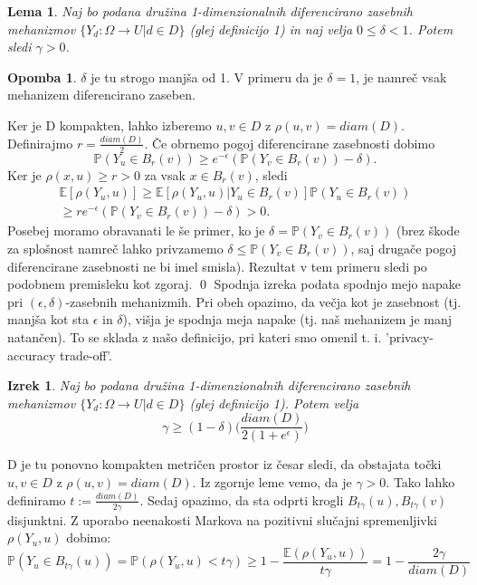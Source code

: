 \documentclass[12pt,a4paper]{amsart}
\theoremstyle{definition} %
\newtheorem{opomba}[definicija]{Opomba}
\theoremstyle{plain} %
\newtheorem{lema}[definicija]{Lema}
\newtheorem{izrek}[definicija]{Izrek}
\begin{document}
\begin{lema}
 Naj bo podana družina 1-dimenzionalnih diferencirano zasebnih mehanizmov $\{ Y_d: \Omega \rightarrow U | d \in D\}$ (glej definicijo 1) in naj velja $0 \leq \delta < 1$. Potem sledi $\gamma > 0$.
\end{lema}
\begin{opomba}
 $\delta$ je tu strogo manjša od 1. V primeru da je $\delta = 1$, je namreč vsak mehanizem diferencirano zaseben.
 \end{opomba}
\proof
 Ker je D kompakten, lahko izberemo $u,v \in D$ z $\rho(u,v)=diam(D)$. Definirajmo $r=\frac{diam(D)}{2}$. Če obrnemo pogoj diferencirane zasebnosti dobimo $$\mathbb{P}(Y_u \in B_r(v)) \geq e^{-\epsilon}(\mathbb{P}(Y_v \in B_r(v)) -\delta).$$ Ker je $\rho(x,u) \geq r > 0$ za vsak $x \in B_r(v)$, sledi 
\begin{gather*}
\mathbb{E}[\rho(Y_u,u)] \geq \mathbb{E}[\rho(Y_u,u) | Y_u \in B_r(v)] \mathbb{P}(Y_u \in B_r(v)) \\
\geq r e^{-\epsilon}(\mathbb{P}(Y_v \in B_r(v)) -\delta) > 0.
\end{gather*}
Posebej moramo obravanati le še primer, ko je $\delta = \mathbb{P}(Y_v \in B_r(v))$ (brez škode za splošnost namreč lahko privzamemo $\delta \leq \mathbb{P}(Y_v \in B_r(v))$, saj drugače pogoj diferencirane zasebnosti ne bi imel smisla). Rezultat v tem primeru sledi po podobnem premisleku kot zgoraj.
\qed
\newline
\newline
Spodnja izreka podata spodnjo mejo napake pri $(\epsilon, \delta)$-zasebnih mehanizmih. Pri obeh opazimo, da večja kot je zasebnost (tj. manjša kot sta $\epsilon$ in $\delta$), višja je spodnja meja napake (tj. naš mehanizem je manj natančen). To se sklada z našo definicijo, pri kateri smo omenil t. i. 'privacy-accuracy trade-off'.
\begin{izrek}
 Naj bo podana družina 1-dimenzionalnih diferencirano zasebnih mehanizmov $\{ Y_d: \Omega \rightarrow U | d \in D\}$ (glej definicijo 1). Potem velja $$\gamma  \geq (1-\delta)\Big(\frac{diam(D)}{2(1+e^\epsilon)}\Big)$$
\end{izrek}
\proof
D je tu ponovno kompakten metričen prostor iz česar sledi, da obstajata točki $u, v \in D$ z $\rho(u,v) = diam(D)$. Iz zgornje leme vemo, da je $\gamma > 0$. Tako lahko definiramo $t := \frac{diam(D)}{2\gamma}$. Sedaj opazimo, da sta odprti krogli $B_{t\gamma}(u), B_{t\gamma}(v) $ disjunktni. Z uporabo neenakosti Markova na pozitivni slučajni spremenljivki $\rho(Y_u, u)$ dobimo: $$\mathbb{P}(Y_u \in B_{t\gamma}(u)) = \mathbb{P}(\rho(Y_u,u) < t\gamma) \geq 1 - \frac{\mathbb{E}(\rho(Y_u,u))}{t\gamma} = 1 - \frac{2\gamma}{diam(D)} $$ 
\end{document}
